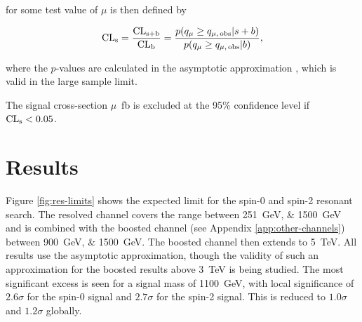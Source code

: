 \CLs for some test value of $\mu$ is then defined by

\begin{equation}
	\label{eqn:cls-def}
	\text{CL}\textsubscript{s} = \frac{\text{CL}\textsubscript{s+b}}{\text{CL}\textsubscript{b}} = \frac{p\qty({q}_{\mu} \ge {q}_{\mu,\,\text{obs}} | s + b)}{p\qty({q}_{\mu} \ge {q}_{\mu,\,\text{obs}} | b)},
\end{equation}

where the $p$-values are calculated in the asymptotic approximation
\cite{Cowan11}, which is valid in the large sample limit.

The signal cross-section {$\mu$}~\si{\femto\barn} is excluded at the 95\% confidence level if $\text{CL}\textsubscript{s} < 0.05$.

\FloatBarrier
\clearpage
\section{Results}
Figure \ref{fig:res-limits} shows the expected limit for the spin-0 and spin-2 resonant search. The 
resolved channel covers the range between \SIlist{251;1500}{\GeV} and is combined with the boosted channel (see Appendix \ref{app:other-channels}) between 
\SIlist{900;1500}{\GeV}. The boosted channel then extends to \SI{5}{\TeV}. All results use the asymptotic approximation, 
though the validity of such an approximation for the boosted results above \SI{3}{\TeV} is being studied. 
The most significant excess is seen for a signal mass of \SI{1100}{\GeV}, with local significance of 
$2.6\sigma$ for the spin-0 signal and 
$2.7\sigma$ for the spin-2 signal. This is reduced to $1.0\sigma$ and $1.2\sigma$ globally. 

